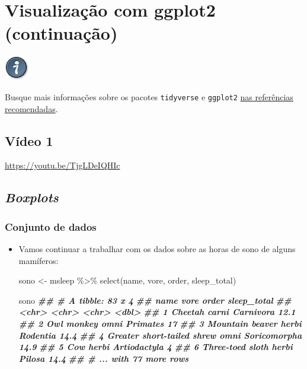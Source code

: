 \documentclass[
  11pt]{report}
\newenvironment{Shaded}{\begin{snugshade}}{\end{snugshade}}
\newcommand{\DocumentationTok}[1]{\textcolor[rgb]{0.56,0.35,0.01}{\textbf{\textit{#1}}}}
\newcommand{\FunctionTok}[1]{\textcolor[rgb]{0.00,0.00,0.00}{#1}}
\newcommand{\NormalTok}[1]{#1}
\newcommand{\OtherTok}[1]{\textcolor[rgb]{0.56,0.35,0.01}{#1}}
\newcommand{\SpecialCharTok}[1]{\textcolor[rgb]{0.00,0.00,0.00}{#1}}
\newenvironment{rmdtip}
{
  \begin{mytip}
    \includegraphics{images/tip.png}
    \tcblower
  }
  {
  \end{mytip}
}
\renewenvironment{Shaded}{
    \begin{mdframed}[%
      roundcorner=2pt,%
      innerleftmargin=5pt,%
      innerrightmargin=5pt,%
      topline=true,%
      leftline=true,%
      rightline=true,%
      bottomline=true,%
      linewidth=0.5pt,%
      linecolor=black!20,%
      backgroundcolor=black!2,%
      skipabove=2ex,%
      skipbelow=2.5ex%
    ]%
  }
  {
    \end{mdframed}
  }
\begin{document}
\hypertarget{viz2}{%
\chapter{Visualização com ggplot2 (continuação)}\label{viz2}}

\begin{rmdtip}
Busque mais informações sobre os pacotes \texttt{tidyverse} e \texttt{ggplot2} \protect\hyperlink{refrec}{nas referências recomendadas}.

\end{rmdtip}

\hypertarget{vuxeddeo-1-3}{%
\section{Vídeo 1}\label{vuxeddeo-1-3}}

\begin{center} \url{https://youtu.be/TjgLDeIQHIc} \end{center}

\hypertarget{boxplots}{%
\section{\texorpdfstring{\emph{Boxplots}}{Boxplots}}\label{boxplots}}

\hypertarget{conjunto-de-dados-1}{%
\subsection{Conjunto de dados}\label{conjunto-de-dados-1}}

\begin{itemize}
\item
  Vamos continuar a trabalhar com os dados sobre as horas de sono de alguns mamíferos:

\begin{Shaded}
\begin{Highlighting}[]
\NormalTok{sono }\OtherTok{\textless{}{-}}\NormalTok{ msleep }\SpecialCharTok{\%\textgreater{}\%} 
  \FunctionTok{select}\NormalTok{(name, vore, order, sleep\_total)}

\NormalTok{sono}
\DocumentationTok{\#\# \# A tibble: 83 x 4}
\DocumentationTok{\#\#   name                       vore  order        sleep\_total}
\DocumentationTok{\#\#   \textless{}chr\textgreater{}                      \textless{}chr\textgreater{} \textless{}chr\textgreater{}              \textless{}dbl\textgreater{}}
\DocumentationTok{\#\# 1 Cheetah                    carni Carnivora           12.1}
\DocumentationTok{\#\# 2 Owl monkey                 omni  Primates            17  }
\DocumentationTok{\#\# 3 Mountain beaver            herbi Rodentia            14.4}
\DocumentationTok{\#\# 4 Greater short{-}tailed shrew omni  Soricomorpha        14.9}
\DocumentationTok{\#\# 5 Cow                        herbi Artiodactyla         4  }
\DocumentationTok{\#\# 6 Three{-}toed sloth           herbi Pilosa              14.4}
\DocumentationTok{\#\# \# ... with 77 more rows}
\end{Highlighting}
\end{Shaded}
\end{itemize}
\end{document}

